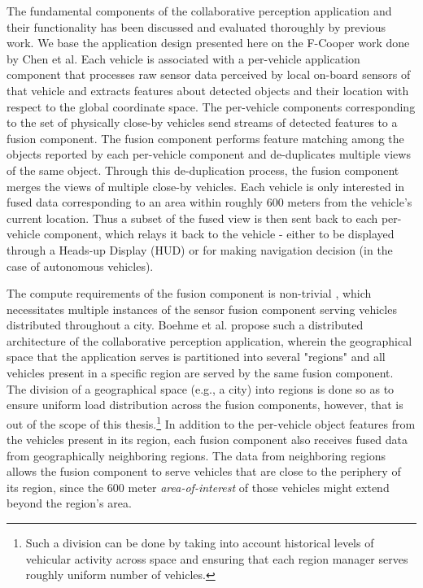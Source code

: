 \par The fundamental components of the collaborative perception application and their functionality has been discussed and evaluated thoroughly by previous work\cite{fcooper, fusioneye, avr}. We base the application design presented here on the F-Cooper \cite{fcooper} work done by Chen et al. Each vehicle is associated with a per-vehicle application component that processes raw sensor data perceived by local on-board sensors of that vehicle and extracts features about detected objects and their location with respect to the global coordinate space.  The per-vehicle components corresponding to the set of physically close-by vehicles send streams of detected features to a fusion component. The fusion component performs feature matching among the objects reported by each per-vehicle component and de-duplicates  multiple views of the same object. Through this de-duplication process, the fusion component merges the views of multiple close-by vehicles.  Each vehicle is only interested in fused data corresponding to an area within roughly 600 meters from the vehicle's current location\cite{talkycars}. Thus a subset of the fused view is then sent back to each per-vehicle component, which relays it back to the vehicle - either to be displayed through a Heads-up Display (HUD) or for making navigation decision (in the case of autonomous vehicles).
\par The compute requirements of the fusion component is non-trivial \cite{fusioneye}, which necessitates multiple instances of the sensor fusion component serving vehicles distributed throughout a city. Boehme et al. \cite{talkycars} propose such a distributed architecture of the collaborative perception application, wherein the geographical space that the application serves is partitioned into several "regions" and all vehicles present in a specific region are served by the same fusion component. The division of a geographical space (e.g., a city) into regions is done so as to ensure uniform load distribution across the fusion components, however, that is out of the scope of this thesis.\footnote{Such a division can be done by taking into account historical levels of vehicular activity across space and ensuring that each region manager serves roughly uniform number of vehicles.} In addition to the per-vehicle object features from the vehicles present in its region, each fusion component also receives fused data from geographically neighboring regions. The data from neighboring regions allows the fusion component to serve vehicles that are close to the periphery of its region, since the 600 meter \textit{area-of-interest} of those vehicles might extend beyond the region's area. 

